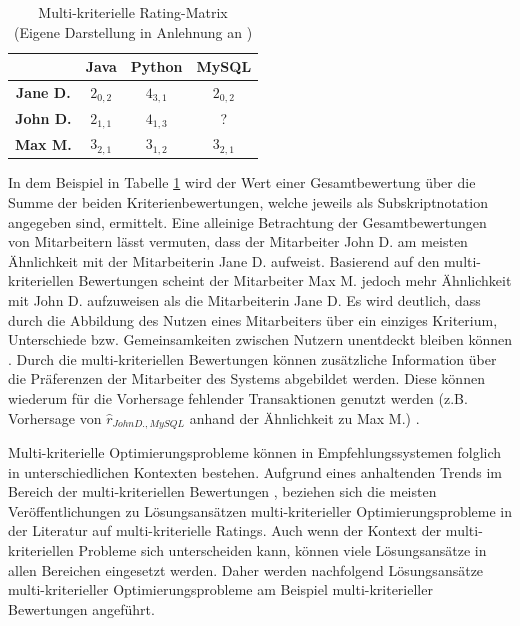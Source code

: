 \begin{table}[htbp]
    \begin{center}
    \begin{tabular}{|c||c|c|c|}
    \hline
    {} & {\textbf{Java}} & {\textbf{Python}} & {\textbf{MySQL}}\\
    \hline
    \hline
    \textbf{Jane D.} & $2_{0,2}$ & $4_{3,1}$ & $2_{0,2}$ \\
    \hline
    \textbf{John D.} & $2_{1,1}$ & $4_{1,3}$ & ? \\
    \hline
    \textbf{Max M.} & $3_{2,1}$ & $3_{1,2}$ & $3_{2,1}$ \\
    \hline
    \end{tabular}
    \end{center}
    \caption[Multi-kriterielle Rating-Matrix ]{Multi-kriterielle Rating-Matrix \\
    (Eigene Darstellung in Anlehnung an \cite[S. 51]{adomavicius:inproceedings:2})}
	\label{tab3}
\end{table}

In dem Beispiel in Tabelle \ref{tab3} wird der Wert einer Gesamtbewertung über die Summe der beiden Kriterienbewertungen, welche jeweils als Subskriptnotation angegeben sind, ermittelt.
Eine alleinige Betrachtung der Gesamtbewertungen von Mitarbeitern lässt vermuten, dass der Mitarbeiter John D. am meisten Ähnlichkeit mit der Mitarbeiterin Jane D. aufweist.
Basierend auf den multi-kriteriellen Bewertungen scheint der Mitarbeiter Max M. jedoch mehr Ähnlichkeit mit John D. aufzuweisen als die Mitarbeiterin Jane D.
Es wird deutlich, dass durch die Abbildung des Nutzen eines Mitarbeiters über ein einziges Kriterium, Unterschiede bzw. Gemeinsamkeiten zwischen Nutzern unentdeckt bleiben können \cite[S. 854]{adomavicius:4:inbook}.
Durch die multi-kriteriellen Bewertungen können zusätzliche Information über die Präferenzen der Mitarbeiter des Systems abgebildet werden.
Diese können wiederum für die Vorhersage fehlender Transaktionen genutzt werden (z.B. Vorhersage von $\hat{r}_{John D., MySQL}$ anhand der Ähnlichkeit zu Max M.) \cite[S. 848]{adomavicius:4:inbook}.

Multi-kriterielle Optimierungsprobleme können in Empfehlungssystemen folglich in unterschiedlichen Kontexten bestehen.
Aufgrund eines anhaltenden Trends im Bereich der multi-kriteriellen Bewertungen \cite[S. 851]{adomavicius:4:inbook}, beziehen sich die meisten Veröffentlichungen zu Lösungsansätzen multi-kriteriel\-ler Optimierungsprobleme in der Literatur auf multi-kriterielle Ratings.
Auch wenn der Kontext der multi-kriteriellen Probleme sich unterscheiden kann, können viele Lösungsansätze in allen Bereichen eingesetzt werden.
Daher werden nachfolgend Lösungsansätze multi-kriterieller Optimierungsprobleme am Beispiel multi-kriterieller Bewertungen angeführt.

